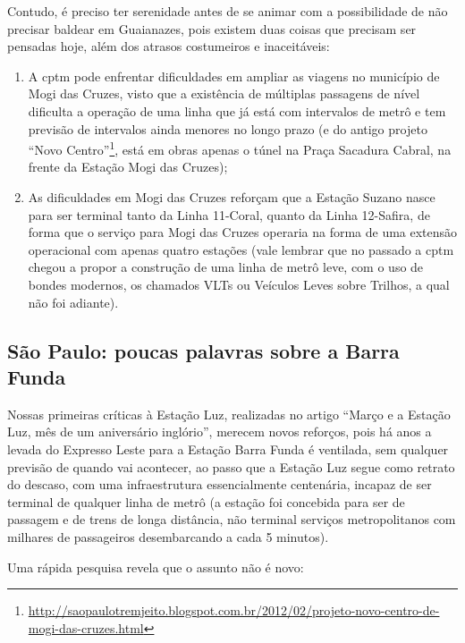 \documentclass[11pt,fleqn]{book} %
\begin{document}
Contudo, é preciso ter serenidade antes de se animar com a possibilidade de não precisar baldear em Guaianazes, pois existem duas coisas que precisam ser pensadas hoje, além dos atrasos costumeiros e inaceitáveis:

\begin{enumerate}
	\item A \gls{cptm} pode enfrentar dificuldades em ampliar as viagens no município de Mogi das Cruzes, visto que a existência de múltiplas passagens de nível dificulta a operação de uma linha que já está com intervalos de metrô e tem previsão de intervalos ainda menores no longo prazo (e do antigo projeto “Novo Centro”\footnote{\url{http://saopaulotremjeito.blogspot.com.br/2012/02/projeto-novo-centro-de-mogi-das-cruzes.html}}, está em obras apenas o túnel na Praça Sacadura Cabral, na frente da Estação Mogi das Cruzes);
	\item As dificuldades em Mogi das Cruzes reforçam que a Estação Suzano nasce para ser terminal tanto da Linha 11-Coral, quanto da Linha 12-Safira, de forma que o serviço para Mogi das Cruzes operaria na forma de uma extensão operacional com apenas quatro estações (vale lembrar que no passado a \gls{cptm} chegou a propor a construção de uma linha de metrô leve, com o uso de bondes modernos, os chamados VLTs ou Veículos Leves sobre Trilhos, a qual não foi adiante).
\end{enumerate}


\subsection{São Paulo: poucas palavras sobre a Barra Funda}

Nossas primeiras críticas à Estação Luz, realizadas no artigo “Março e a Estação Luz, mês de um aniversário inglório”, merecem novos reforços, pois há anos a levada do Expresso Leste para a Estação Barra Funda é ventilada, sem qualquer previsão de quando vai acontecer, ao passo que a Estação Luz segue como retrato do descaso, com uma infraestrutura essencialmente centenária, incapaz de ser terminal de qualquer linha de metrô (a estação foi concebida para ser de passagem e de trens de longa distância, não terminal serviços metropolitanos com milhares de passageiros desembarcando a cada 5 minutos).

Uma rápida pesquisa revela que o assunto não é novo:
\end{document}
